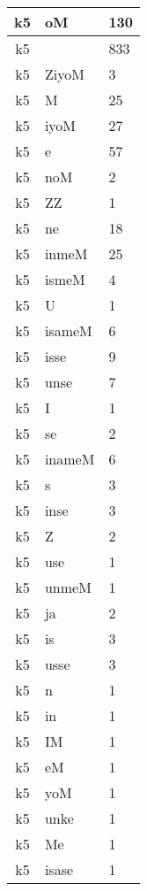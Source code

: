\documentclass[a4 paper]{article}
\begin{document}
\begin{longtable}{cp{}p{}}
k5 & oM & 130\\ \midrule k5 &  & 833\\ \midrule k5 & ZiyoM & 3\\ \midrule k5 & M & 25\\ \midrule k5 & iyoM & 27\\ \midrule k5 & e & 57\\ \midrule k5 & noM & 2\\ \midrule k5 & ZZ & 1\\ \midrule k5 & ne & 18\\ \midrule k5 & inmeM & 25\\ \midrule k5 & ismeM & 4\\ \midrule k5 & U & 1\\ \midrule k5 & isameM & 6\\ \midrule k5 & isse & 9\\ \midrule k5 & unse & 7\\ \midrule k5 & I & 1\\ \midrule k5 & se & 2\\ \midrule k5 & inameM & 6\\ \midrule k5 & s & 3\\ \midrule k5 & inse & 3\\ \midrule k5 & Z & 2\\ \midrule k5 & use & 1\\ \midrule k5 & unmeM & 1\\ \midrule k5 & ja & 2\\ \midrule k5 & is & 3\\ \midrule k5 & usse & 3\\ \midrule k5 & n & 1\\ \midrule k5 & in & 1\\ \midrule k5 & IM & 1\\ \midrule k5 & eM & 1\\ \midrule k5 & yoM & 1\\ \midrule k5 & unke & 1\\ \midrule k5 & Me & 1\\ \midrule k5 & isase & 1\\ \midrule 

\end{longtable}
\end{document}
